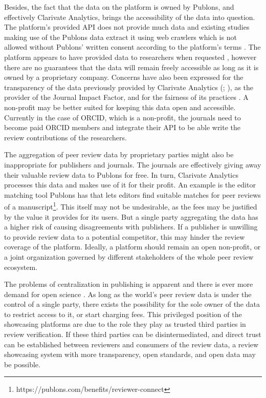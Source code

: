 Besides, the fact that the data on the platform is owned by Publons, and effectively Clarivate Analytics, brings the accessibility of the data into question. The platform’s provided API does not provide much data and existing studies making use of the Publons data extract it using web crawlers \parencite[952]{Ortega.2017} which is not allowed without Publons’ written consent according to the platform’s terms \parencite{publons_2014}. The platform appears to have provided data to researchers when requested \parencite[12]{Kovanis.2016}, however there are no guarantees that the data will remain freely accessible as long as it is owned by a proprietary company. Concerns have also been expressed for the transparency of the data previously provided by Clarivate Analytics (\cite{Rossner.2007}; \cite[3]{TeixeiradaSilva.2019}), as the provider of the Journal Impact Factor, and for the fairness of its practices \parencite{TeixeiradaSilva.2013}. A non-profit may be better suited for keeping this data open and accessible. Currently in the case of \acrshort{ORCID}, which is a non-profit, the journals need to become paid \acrshort{ORCID} members and integrate their \acrshort{API} to be able write the review contributions of the researchers.

The aggregation of peer review data by proprietary parties might also be inappropriate for publishers and journals. The journals are effectively giving away their valuable review data to Publons for free. In turn, Clarivate Analytics processes this data and makes use of it for their profit. An example is the editor matching tool Publons has that lets editors find suitable matches for peer reviews of a manuscript\footnote{https://publons.com/benefits/reviewer-connect}. This itself may not be undesirable, as the fees may be justified by the value it provides for its users. But a single party aggregating the data has a higher risk of causing disagreements with publishers. If a publisher is unwilling to provide review data to a potential competitor, this may hinder the review coverage of the platform. Ideally, a platform should remain an open non-profit, or a joint organization governed by different stakeholders of the whole peer review ecosystem.

The problems of centralization in publishing is apparent \parencite{Lariviere.2015} and there is ever more demand for open science \parencite[1-3]{Piwowar.2018}. As long as the world’s peer review data is under the control of a single party, there exists the possibility for the sole owner of the data to restrict access to it, or start charging fees. This privileged position of the showcasing platforms are due to the role they play as trusted third parties in review verification. If these third parties can be disintermediated, and direct trust can be established between reviewers and consumers of the review data, a review showcasing system with more transparency, open standards, and open data may be possible.

